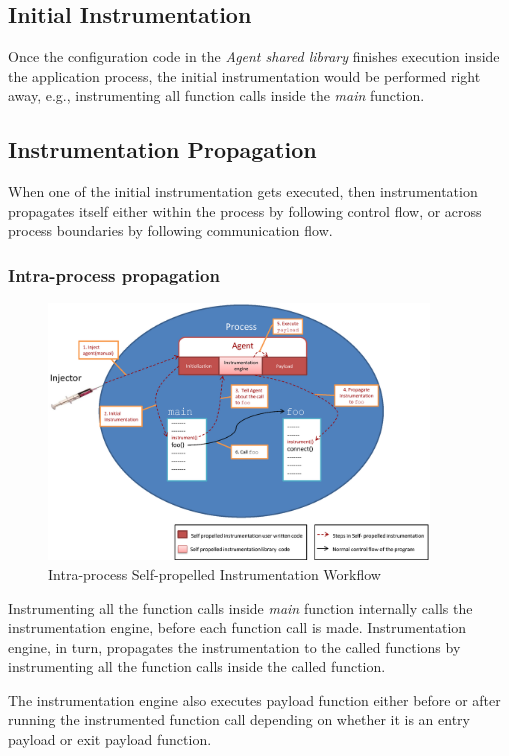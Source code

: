\subsection{Initial Instrumentation}
Once the configuration code in the {\em Agent shared library} finishes execution
inside the application process, the initial instrumentation would be performed
right away, e.g., instrumenting all function calls inside the {\em main}
function.

\subsection{Instrumentation Propagation}
When one of the initial instrumentation gets executed, then instrumentation
propagates itself either within the process by following control flow, or across
process boundaries by following communication flow.

\subsubsection{Intra-process propagation}
\begin{figure}[ht]
  \centering
  \includegraphics[width=0.90\textwidth]{figure/intraprocess.eps}
  \caption{Intra-process Self-propelled Instrumentation Workflow}
   \label{fig:intrainst}
\end{figure}

Instrumenting all the function calls inside {\em main} function internally calls
the instrumentation engine, before each function call is made.
Instrumentation engine, in turn, propagates the instrumentation to the called
functions by instrumenting all the function calls inside the called function.

The instrumentation engine also executes payload function either before or after
running the instrumented function call depending on whether it is an entry
payload or exit payload function.

